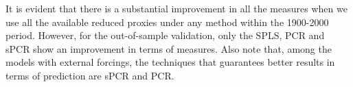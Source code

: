 \documentclass[11pt]{amsart}
\theoremstyle{plain}
\theoremstyle{definition}
\theoremstyle{remark}
\begin{document}
It is evident that there is a substantial improvement
in all the measures when we use all the available reduced proxies under any
method within the 1900-2000 period. However, for the out-of-sample validation, only
the SPLS, PCR and sPCR show an improvement in terms of measures.  Also note that, among the models with external forcings, the techniques that
guarantees better results in terms of prediction are sPCR and PCR.
\end{document}
